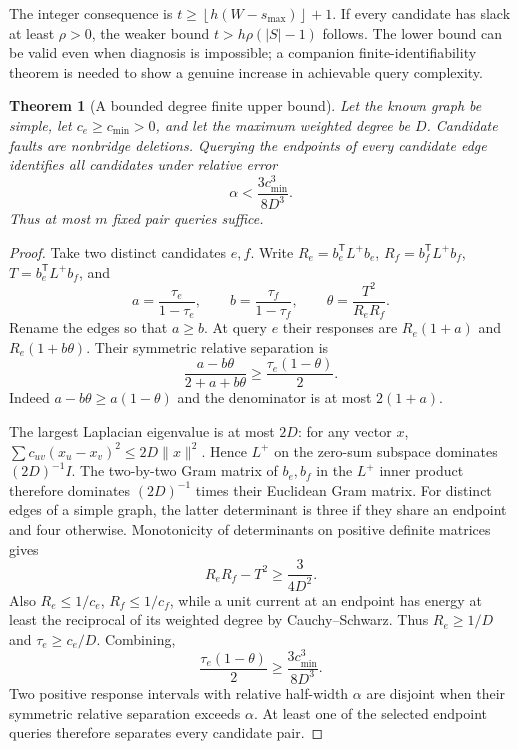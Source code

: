 \documentclass[11pt,letterpaper]{article}
\newtheorem{theorem}{Theorem}
\newcommand{\floor}[1]{\left\lfloor #1\right\rfloor}
\begin{document}
The integer consequence is $t\ge\floor{h(W-s_{\max})}+1$. If every candidate has slack at least $\rho>0$, the weaker bound $t>h\rho(|S|-1)$ follows. The lower bound can be valid even when diagnosis is impossible; a companion finite-identifiability theorem is needed to show a genuine increase in achievable query complexity.

\begin{theorem}[A bounded degree finite upper bound]\label{thm:boundeddegree}
Let the known graph be simple, let $c_e\ge c_{\min}>0$, and let the maximum weighted degree be $D$. Candidate faults are nonbridge deletions. Querying the endpoints of every candidate edge identifies all candidates under relative error
\[
 \alpha<\frac{3c_{\min}^3}{8D^3}.
\]
Thus at most $m$ fixed pair queries suffice.
\end{theorem}
\begin{proof}
Take two distinct candidates $e,f$. Write $R_e=b_e^{\mathsf T}L^+b_e$, $R_f=b_f^{\mathsf T}L^+b_f$, $T=b_e^{\mathsf T}L^+b_f$, and
\[
 a=\frac{\tau_e}{1-\tau_e},\qquad
 b=\frac{\tau_f}{1-\tau_f},\qquad
 \theta=\frac{T^2}{R_eR_f}.
\]
Rename the edges so that $a\ge b$. At query $e$ their responses are $R_e(1+a)$ and $R_e(1+b\theta)$. Their symmetric relative separation is
\[
 \frac{a-b\theta}{2+a+b\theta}
 \ge\frac{\tau_e(1-\theta)}2.
\]
Indeed $a-b\theta\ge a(1-\theta)$ and the denominator is at most $2(1+a)$.

The largest Laplacian eigenvalue is at most $2D$: for any vector $x$, $\sum c_{uv}(x_u-x_v)^2\le2D\|x\|^2$. Hence $L^+$ on the zero-sum subspace dominates $(2D)^{-1}I$. The two-by-two Gram matrix of $b_e,b_f$ in the $L^+$ inner product therefore dominates $(2D)^{-1}$ times their Euclidean Gram matrix. For distinct edges of a simple graph, the latter determinant is three if they share an endpoint and four otherwise. Monotonicity of determinants on positive definite matrices gives
\[
 R_eR_f-T^2\ge\frac3{4D^2}.
\]
Also $R_e\le1/c_e$, $R_f\le1/c_f$, while a unit current at an endpoint has energy at least the reciprocal of its weighted degree by Cauchy--Schwarz. Thus $R_e\ge1/D$ and $\tau_e\ge c_e/D$. Combining,
\[
 \frac{\tau_e(1-\theta)}2
 \ge\frac{3c_{\min}^3}{8D^3}.
\]
Two positive response intervals with relative half-width $\alpha$ are disjoint when their symmetric relative separation exceeds $\alpha$. At least one of the selected endpoint queries therefore separates every candidate pair.
\end{proof}
\end{document}

